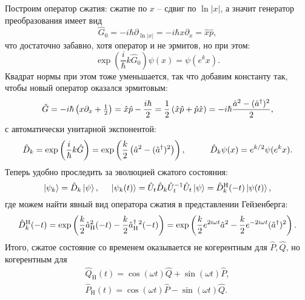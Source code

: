Построим оператор сжатия: сжатие по $x$ -- сдвиг по $\ln |x|$, а значит генератор преобразования имеет вид
\begin{equation*}
    \hat{G}_0 = - i \hbar \partial_{\ln |x|} = - i \hbar x \partial_x = \hat{x} \hat{p},
\end{equation*}
что достаточно забавно, хотя оператор и не эрмитов, но при этом:
\begin{equation*}
    \exp\left(\frac{i}{\hbar} k \hat{G}_0 \right) \psi(x) = \psi(e^k x).
\end{equation*}
Квадрат нормы при этом тоже уменьшается, так что добавим константу так, чтобы новый оператор оказался эрмитовым:
\begin{equation*}
    \hat{G} = - i \hbar \left(x \partial_x + \tfrac{1}{2}\right) = \hat{x} \hat{p} - \frac{i \hbar}{2} = \frac{1}{2} \left(\hat{x} \hat{p} + \hat{p} \hat{x}\right) = - i \hbar \frac{\hat{a}^2 - (\hat{a}^{\dag})^2}{2},
\end{equation*}
с автоматически унитарной экспонентой:
\begin{equation*}
    \hat{D}_k = \exp\left(\frac{i}{\hbar} k \hat{G}\right) = \exp\left(
        \frac{k}{2} \left(\hat{a}^2 - (\hat{a}\con)^2\right)
    \right),
    \hspace{10 mm}  
    \hat{D}_k \psi(x) = e^{k/2}\psi(e^k x).
\end{equation*}
Теперь удобно проследить за эволюцией сжатого состояния:
\begin{equation*}
    \left| \psi_k \right\rangle = \hat{D}_k \left| \psi \right\rangle,
    \hspace{5 mm} 
    \left| \psi_k (t) \right\rangle = \hat{U}_t \hat{D}_k \hat{U}_{t}^{-1} \hat{U}_t \left| \psi \right\rangle = \hat{D}_k^{\text{H}} (-t) \left| \psi(t) \right\rangle,
\end{equation*}
где можем найти явный вид оператора сжатия в представлении Гейзенберга:
\begin{equation*}
    \hat{D}_k^{\text{H}} (-t) = \exp \left(
        \frac{k}{2} \hat{a}_{\text{H}}^2(-t) - \frac{k}{2} \hat{a}^{\dag}_{\text{H}}{}^2 (-t)
    \right) = \exp  \left(
       \frac{k}{2} e^{2 i \omega t} \hat{a}^2 - \frac{k}{2} e^{-2 i \omega t} (\hat{a}^{\dag})^2
    \right).
\end{equation*}
Итого, сжатое состояние со временем оказывается не когерентным для $\hat{P}, \hat{Q}$, но когерентным для
\begin{align*}
    \hat{Q}_{\text{H}} (t) = \cos (\omega t) \hat{Q} + \sin(\omega t) \hat{P}, \\
    \hat{P}_{\text{H}} (t) = \cos (\omega t) \hat{P} -\sin (\omega t) \hat{Q}.
\end{align*}

